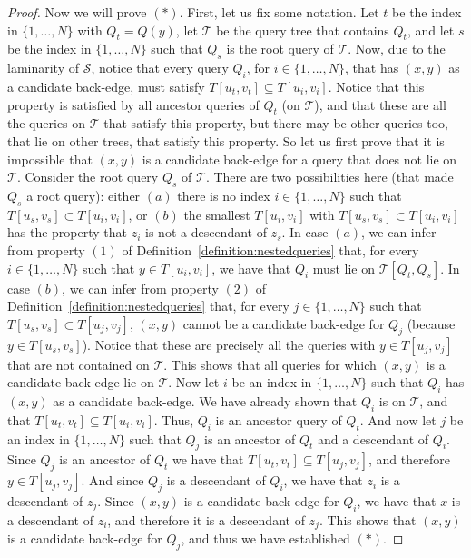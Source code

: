 \documentclass[11pt,a4paper]{article}
\begin{document}
\begin{proof}
Now we will prove $(*)$. First, let us fix some notation. Let $t$ be the index in $\{1,\dots,N\}$ with $Q_t=Q(y)$, let $\mathcal{T}$ be the query tree that contains $Q_t$, and let $s$ be the index in $\{1,\dots,N\}$ such that $Q_s$ is the root query of $\mathcal{T}$. Now, due to the laminarity of $\mathcal{S}$, notice that every query $Q_i$, for $i\in\{1,\dots,N\}$, that has $(x,y)$ as a candidate back-edge, must satisfy $T[u_t,v_t]\subseteq T[u_i,v_i]$. Notice that this property is satisfied by all ancestor queries of $Q_t$ (on $\mathcal{T}$), and that these are all the queries on $\mathcal{T}$ that satisfy this property, but there may be other queries too, that lie on other trees, that satisfy this property. So let us first prove that it is impossible that $(x,y)$ is a candidate back-edge for a query that does not lie on $\mathcal{T}$. Consider the root query $Q_s$ of $\mathcal{T}$. There are two possibilities here (that made $Q_s$ a root query): either $(a)$ there is no index $i\in\{1,\dots,N\}$ such that $T[u_s,v_s]\subset T[u_i,v_i]$, or $(b)$ the smallest $T[u_i,v_i]$ with $T[u_s,v_s]\subset T[u_i,v_i]$ has the property that $z_i$ is not a descendant of $z_s$. In case $(a)$, we can infer from property $(1)$ of Definition~\ref{definition:nestedqueries} that, for every $i\in\{1,\dots,N\}$ such that $y\in T[u_i,v_i]$, we have that $Q_i$ must lie on $\mathcal{T}[Q_t,Q_s]$. In case $(b)$, we can infer from property $(2)$ of Definition~\ref{definition:nestedqueries} that, for every $j\in\{1,\dots,N\}$ such that $T[u_s,v_s]\subset T[u_j,v_j]$, $(x,y)$ cannot be a candidate back-edge for $Q_j$ (because $y\in T[u_s,v_s]$). Notice that these are precisely all the queries with $y\in T[u_j,v_j]$ that are not contained on $\mathcal{T}$. This shows that all queries for which $(x,y)$ is a candidate back-edge lie on $\mathcal{T}$. Now let $i$ be an index in $\{1,\dots,N\}$ such that $Q_i$ has $(x,y)$ as a candidate back-edge. We have already shown that $Q_i$ is on $\mathcal{T}$, and that $T[u_t,v_t]\subseteq T[u_i,v_i]$. Thus, $Q_i$ is an ancestor query of $Q_t$. And now let $j$ be an index in $\{1,\dots,N\}$ such that $Q_j$ is an ancestor of $Q_t$ and a descendant of $Q_i$. Since $Q_j$ is an ancestor of $Q_t$ we have that $T[u_t,v_t]\subseteq T[u_j,v_j]$, and therefore $y\in T[u_j,v_j]$. And since $Q_j$ is a descendant of $Q_i$, we have that $z_i$ is a descendant of $z_j$. Since $(x,y)$ is a candidate back-edge for $Q_i$, we have that $x$ is a descendant of $z_i$, and therefore it is a descendant of $z_j$. This shows that $(x,y)$ is a candidate back-edge for $Q_j$, and thus we have established $(*)$.


\end{proof}
\end{document}
